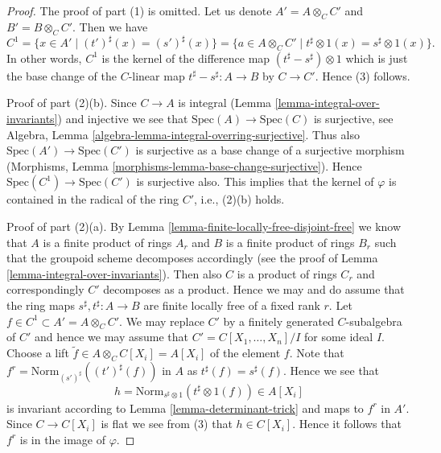 \begin{proof}
The proof of part (1) is omitted. Let us denote $A' = A \otimes_C C'$ and
$B' = B \otimes_C C'$. Then we have
$$
C^1
= \{x \in A' \mid (t')^\sharp(x) = (s')^\sharp(x) \}
= \{a \in A \otimes_C C' \mid t^\sharp \otimes 1(x) = s^\sharp \otimes 1(x) \}.
$$
In other words, $C^1$ is the kernel of the difference map
$(t^\sharp - s^\sharp) \otimes 1$ which is just the base change
of the $C$-linear map $t^\sharp - s^\sharp : A \to B$ by $C \to C'$.
Hence (3) follows.

\medskip\noindent
Proof of part (2)(b). Since $C \to A$ is integral
(Lemma \ref{lemma-integral-over-invariants}) and injective we see that
$\text{Spec}(A) \to \text{Spec}(C)$ is surjective, see
Algebra, Lemma \ref{algebra-lemma-integral-overring-surjective}.
Thus also $\text{Spec}(A') \to \text{Spec}(C')$ is surjective
as a base change of a surjective morphism
(Morphisms, Lemma \ref{morphisms-lemma-base-change-surjective}).
Hence $\text{Spec}(C^1) \to \text{Spec}(C')$ is surjective also.
This implies that the kernel of $\varphi$ is contained in the
radical of the ring $C'$, i.e., (2)(b) holds.

\medskip\noindent
Proof of part (2)(a). By Lemma \ref{lemma-finite-locally-free-disjoint-free}
we know that $A$ is a finite
product of rings $A_r$ and $B$ is a finite product of rings $B_r$
such that the groupoid scheme decomposes accordingly (see the proof
of Lemma \ref{lemma-integral-over-invariants}).
Then also $C$ is a product of rings $C_r$ and
correspondingly $C'$ decomposes as a product. Hence we may and do
assume that the ring maps $s^\sharp, t^\sharp : A \to B$ are finite
locally free of a fixed rank $r$. Let $f \in C^1 \subset A' = A \otimes_C C'$.
We may replace $C'$ by a finitely generated $C$-subalgebra of $C'$
and hence we may assume that $C' = C[X_1, \ldots, X_n]/I$ for some
ideal $I$. Choose a lift $\tilde f \in A \otimes_C C[X_i] = A[X_i]$
of the element $f$. Note that
$f^r = \text{Norm}_{(s')^\sharp}((t')^\sharp(f))$ in $A$ as
$t^\sharp(f) = s^\sharp(f)$. Hence we see that
$$
h = \text{Norm}_{s^\sharp \otimes 1}(t^\sharp \otimes 1(f)) \in A[X_i]
$$
is invariant according to Lemma \ref{lemma-determinant-trick}
and maps to $f^r$ in $A'$.
Since $C \to C[X_i]$ is flat we see from (3) that $h \in C[X_i]$.
Hence it follows that $f^r$ is in the image of $\varphi$.
\end{proof}

